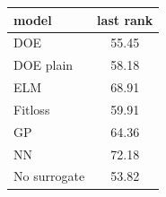 \begin{tabular}{|lc|}
\hline
model & last rank\\
\hline
DOE & 55.45 \\
DOE plain & 58.18 \\
ELM & 68.91 \\
Fitloss & 59.91 \\
GP & 64.36 \\
NN & 72.18 \\
No surrogate & 53.82 \\
\hline
\end{tabular}
